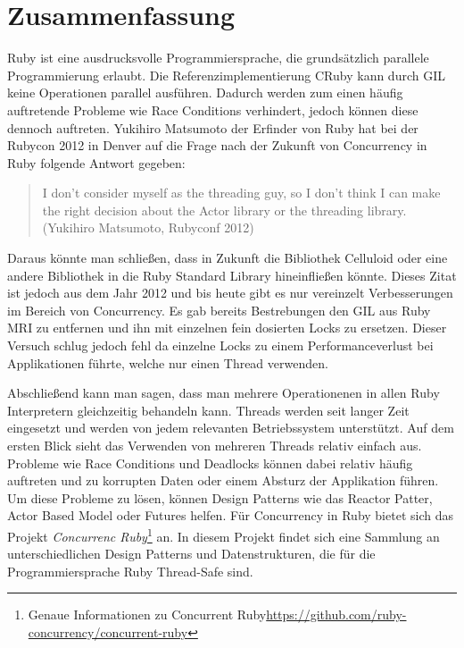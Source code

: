 \section{Zusammenfassung}
Ruby ist eine ausdrucksvolle Programmiersprache, die grundsätzlich parallele Programmierung erlaubt. Die Referenzimplementierung CRuby kann durch GIL keine Operationen parallel ausführen. Dadurch werden zum einen häufig auftretende Probleme wie Race Conditions verhindert, jedoch können diese dennoch auftreten. Yukihiro Matsumoto der Erfinder von Ruby hat bei der Rubycon 2012 in Denver auf die Frage nach der Zukunft von Concurrency in Ruby folgende Antwort gegeben:

\begin{quote}
I don't consider myself as the threading guy, so I don't think I can make the right decision about the Actor library or the threading library.
 (Yukihiro Matsumoto, Rubyconf 2012)
\end{quote}

Daraus könnte man schließen, dass in Zukunft die Bibliothek Celluloid oder eine andere Bibliothek in die Ruby Standard Library hineinfließen könnte. Dieses Zitat ist jedoch aus dem Jahr 2012 und bis heute gibt es nur vereinzelt Verbesserungen im Bereich von Concurrency. Es gab bereits Bestrebungen den GIL aus Ruby MRI zu entfernen und ihn mit einzelnen fein dosierten Locks zu ersetzen. Dieser Versuch schlug jedoch fehl da einzelne Locks zu einem Performanceverlust bei Applikationen führte, welche nur einen Thread verwenden. 

Abschließend kann man sagen, dass man mehrere Operationenen in allen Ruby Interpretern gleichzeitig behandeln kann. Threads werden seit langer Zeit eingesetzt und werden von jedem relevanten Betriebssystem unterstützt. Auf dem ersten Blick sieht das Verwenden von mehreren Threads relativ einfach aus. Probleme wie Race Conditions und Deadlocks können dabei relativ häufig auftreten und zu korrupten Daten oder einem Absturz der Applikation führen. Um diese Probleme zu lösen, können Design Patterns wie das Reactor Patter, Actor Based Model oder Futures helfen. Für Concurrency in Ruby bietet sich das Projekt \emph{Concurrenc Ruby}\footnote{Genaue Informationen zu Concurrent Ruby\url{https://github.com/ruby-concurrency/concurrent-ruby}} an. In diesem Projekt findet sich eine Sammlung an unterschiedlichen Design Patterns und Datenstrukturen, die für die Programmiersprache Ruby Thread-Safe sind.

